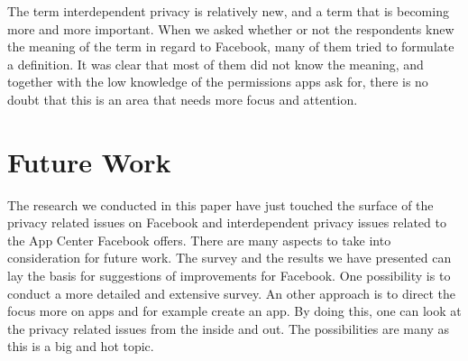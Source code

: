 The term interdependent privacy is relatively new, and a term that is becoming more and more important. When we asked whether or not the respondents knew the meaning of the term in regard to Facebook, many of them tried to formulate a definition. It was clear that most of them did not know the meaning, and together with the low knowledge of the permissions apps ask for, there is no doubt that this is an area that needs more focus and attention. 

\section{Future Work}
The research we conducted in this paper have just touched the surface of the privacy related issues on Facebook and interdependent privacy issues related to the App Center Facebook offers. There are many aspects to take into consideration for future work. The survey and the results we have presented can lay the basis for suggestions of improvements for Facebook. One possibility is to conduct a more detailed and extensive survey. An other approach is to direct the focus more on apps and for example create an app. By doing this, one can look at the privacy related issues from the inside and out. The possibilities are many as this is a big and hot topic. 


